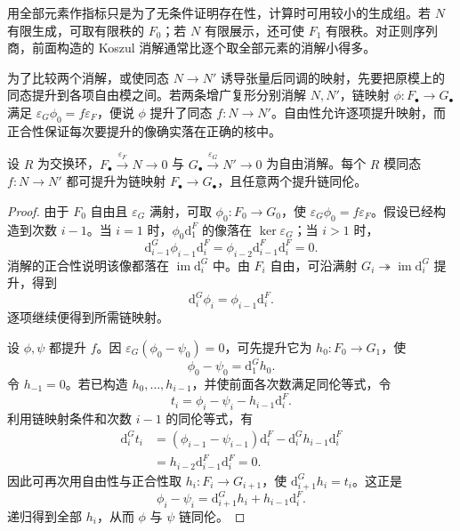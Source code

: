 用全部元素作指标只是为了无条件证明存在性，计算时可用较小的生成组。若 \(N\) 有限生成，可取有限秩的 \(F_0\)；若 \(N\) 有限展示，还可使 \(F_1\) 有限秩。对正则序列商，前面构造的 Koszul 消解通常比逐个取全部元素的消解小得多。

\ProseParagraphBreak
为了比较两个消解，或使同态 \(N\to N'\) 诱导张量后同调的映射，先要把原模上的同态提升到各项自由模之间。若两条增广复形分别消解 \(N,N'\)，链映射 \(\phi:F_\bullet\rightarrow G_\bullet\) 满足 \(\varepsilon_G\phi_0=f\varepsilon_F\)，便说 \(\phi\) 提升了同态 \(f:N\rightarrow N'\)。自由性允许逐项提升映射，而正合性保证每次要提升的像确实落在正确的核中。

\begin{lemma}[消解比较]\label{b3:lem:free-resolution-comparison}
	设 \(R\) 为交换环，\(F_\bullet\xrightarrow{\varepsilon_F}N\rightarrow0\) 与 \(G_\bullet\xrightarrow{\varepsilon_G}N'\rightarrow0\) 为自由消解。每个 \(R\) 模同态 \(f:N\rightarrow N'\) 都可提升为链映射 \(F_\bullet\rightarrow G_\bullet\)，且任意两个提升链同伦。
\end{lemma}
\begin{proof}
	由于 \(F_0\) 自由且 \(\varepsilon_G\) 满射，可取 \(\phi_0:F_0\rightarrow G_0\)，使 \(\varepsilon_G\phi_0=f\varepsilon_F\)。假设已经构造到次数 \(i-1\)。当 \(i=1\) 时，\(\phi_0\mathrm{d}_1^F\) 的像落在 \(\ker\varepsilon_G\)；当 \(i>1\) 时，
	\[
		\mathrm{d}_{i-1}^G\phi_{i-1}\mathrm{d}_i^F =\phi_{i-2}\mathrm{d}_{i-1}^F\mathrm{d}_i^F=0.
	\]
	消解的正合性说明该像都落在 \(\operatorname{im}\mathrm{d}_i^G\) 中。由 \(F_i\) 自由，可沿满射 \(G_i\twoheadrightarrow\operatorname{im}\mathrm{d}_i^G\) 提升，得到
	\[
		\mathrm{d}_i^G\phi_i=\phi_{i-1}\mathrm{d}_i^F.
	\]
	逐项继续便得到所需链映射。

	设 \(\phi,\psi\) 都提升 \(f\)。因 \(\varepsilon_G(\phi_0-\psi_0)=0\)，可先提升它为 \(h_0:F_0\rightarrow G_1\)，使
	\[
		\phi_0-\psi_0=\mathrm{d}_1^Gh_0.
	\]
	令 \(h_{-1}=0\)。若已构造 \(h_0,\ldots,h_{i-1}\)，并使前面各次数满足同伦等式，令
	\[
		t_i=\phi_i-\psi_i-h_{i-1}\mathrm{d}_i^F.
	\]
	利用链映射条件和次数 \(i-1\) 的同伦等式，有
	\[
		\begin{aligned}
			\mathrm{d}_i^Gt_i &=(\phi_{i-1}-\psi_{i-1})\mathrm{d}_i^F -\mathrm{d}_i^Gh_{i-1}\mathrm{d}_i^F\\
			&=h_{i-2}\mathrm{d}_{i-1}^F\mathrm{d}_i^F=0.
		\end{aligned}
	\]
	因此可再次用自由性与正合性取 \(h_i:F_i\rightarrow G_{i+1}\)，使 \(\mathrm{d}_{i+1}^Gh_i=t_i\)。这正是
	\[
		\phi_i-\psi_i=\mathrm{d}_{i+1}^Gh_i+h_{i-1}\mathrm{d}_i^F.
	\]
	递归得到全部 \(h_i\)，从而 \(\phi\) 与 \(\psi\) 链同伦。
\end{proof}

